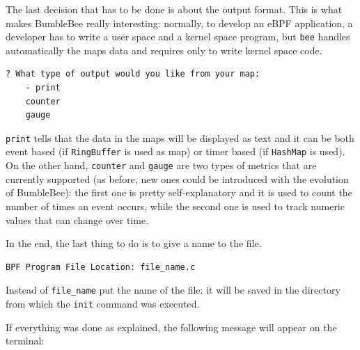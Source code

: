 The last decision that has to be done is about the output format.
This is what makes BumbleBee really interesting: normally, to develop an eBPF application, a developer has to write a user space and a kernel space program, but \colorbox{backcolour}{\lstinline[style=commandline, language=bash, breaklines=true]|bee|} handles automatically the maps data and requires only to write kernel space code.

\begin{lstlisting}[style=commandline, language=bash, caption={\colorbox{backcolour}{\lstinline[style=commandline, language=bash]|bee|} output format selection.}]
	? What type of output would you like from your map: 
	- print
	counter
	gauge
\end{lstlisting}

\colorbox{backcolour}{\lstinline[style=commandline, language=bash, breaklines=true]|print|} tells that the data in the maps will be displayed as text and it can be both event based (if \colorbox{backcolour}{\lstinline[style=commandline, language=bash, breaklines=true]|RingBuffer|} is used as map) or timer based (if \colorbox{backcolour}{\lstinline[style=commandline, language=bash, breaklines=true]|HashMap|} is used).
On the other hand, \colorbox{backcolour}{\lstinline[style=commandline, language=bash, breaklines=true]|counter|} and \colorbox{backcolour}{\lstinline[style=commandline, language=bash, breaklines=true]|gauge|} are two types of metrics that are currently supported (as before, new ones could be introduced with the evolution of BumbleBee): the first one is pretty self-explanatory and it is used to count the number of times an event occurs, while the second one is used to track numeric values that can change over time.

In the end, the last thing to do is to give a name to the file.

\begin{lstlisting}[style=commandline, language=bash, caption={\colorbox{backcolour}{\lstinline[style=commandline, language=bash]|bee|} program file location.}]
	BPF Program File Location: file_name.c
\end{lstlisting}

Instead of \colorbox{backcolour}{\lstinline[style=commandline, language=bash, breaklines=true]|file_name|} put the name of the file: it will be saved in the directory from which the \colorbox{backcolour}{\lstinline[style=commandline, language=bash, breaklines=true]|init|} command was executed.

If everything was done as explained, the following message will appear on the terminal:

